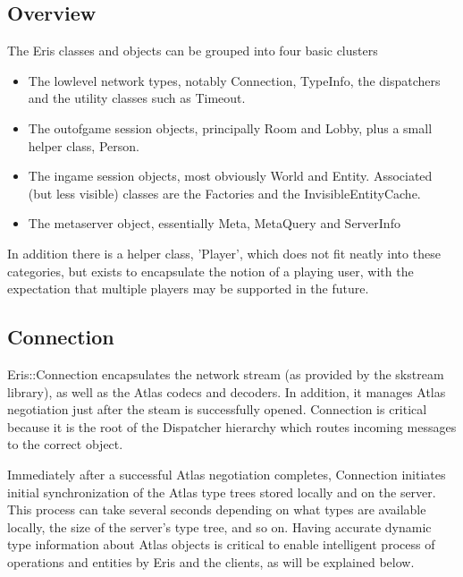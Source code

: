 \subsection{Overview}



The Eris classes and objects can be grouped into four basic clusters

\begin{itemize}

\item The lowlevel network types, notably Connection, TypeInfo, the
dispatchers and the utility classes such as Timeout.

\item The outofgame session objects, principally Room and Lobby, plus
a small helper class, Person.

\item The ingame session objects, most obviously World and Entity. Associated
(but less visible) classes are the Factories and the InvisibleEntityCache.

\item The metaserver object, essentially Meta, MetaQuery and ServerInfo

\end{itemize}



In addition there is a helper class, 'Player', which does not fit neatly into these
categories, but exists to encapsulate the notion of a playing user, with the
expectation that multiple players may be supported in the future.



\subsection{Connection}



Eris::Connection encapsulates the network stream (as provided by the skstream library),
as well as the Atlas codecs and decoders. In addition, it manages Atlas negotiation just
after the steam is successfully opened. Connection is critical because it is the root of the
Dispatcher hierarchy which routes incoming messages to the correct object.



Immediately after a successful Atlas negotiation completes, Connection initiates initial
synchronization of the Atlas type trees stored locally and on the server. This process can
take several seconds depending on what types are available locally, the size of the server's
type tree, and so on. Having accurate dynamic type information about Atlas objects is
critical to enable intelligent process of operations and entities by Eris and the clients,
as will be explained below.  



